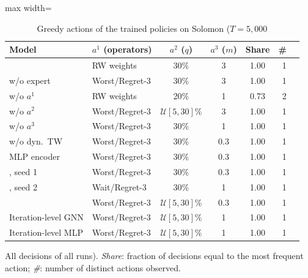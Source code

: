 \begin{table}[t]
\centering
\caption{Greedy actions of the trained policies on Solomon ($T=5{,}000$}\label{tab:collapse}
\setlength{\tabcolsep}{3pt}
\begin{adjustbox}{max width=\linewidth}
\begin{tabular}{llcccrr}
\toprule
Model & $a^1$ (operators) & $a^2$ ($q$) & $a^3$ ($m$) & Share & \# \\ \midrule
\sgalns{} & RW weights & 30\% & 3 & 1.00 & 1\\
w/o expert & Worst/Regret-3 & 30\% & 3 & 1.00 & 1\\
w/o $a^1$ & RW weights & 20\% & 1 & 0.73 & 2\\
w/o $a^2$ & Worst/Regret-3 & $\mathcal U[5,30]\%$ & 3 & 1.00 & 1\\
w/o $a^3$ & Worst/Regret-3 & 30\% & 1 & 1.00 & 1\\
w/o dyn.\ TW & Worst/Regret-3 & 30\% & 0.3 & 1.00 & 1\\
MLP encoder & Worst/Regret-3 & 30\% & 0.3 & 1.00 & 1\\
\sgalns{}, seed 1 & Worst/Regret-3 & 30\% & 0.3 & 1.00 & 1\\
\sgalns{}, seed 2 & Wait/Regret-3 & 30\% & 1 & 1.00 & 1\\
\sgc{} & Worst/Regret-3 & $\mathcal U[5,30]\%$ & 0.3 & 1.00 & 1\\
\midrule Iteration-level GNN & Worst/Regret-3 & $\mathcal U[5,30]\%$ & 1 & 1.00 & 1\\
Iteration-level MLP & Worst/Regret-3 & $\mathcal U[5,30]\%$ & 1 & 1.00 & 1\\
\bottomrule
\end{tabular}
\end{adjustbox}
\par\vspace{2pt}\parbox{\linewidth}{\footnotesize All decisions of all runs). \emph{Share}: fraction of decisions equal to the most frequent action; \emph{\#}: number of distinct actions observed.}
\end{table}
